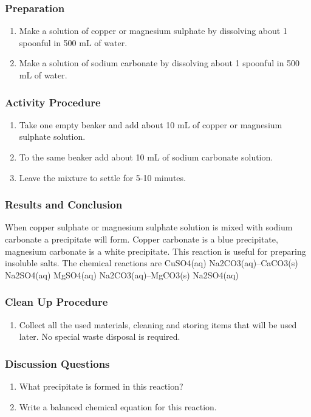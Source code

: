 \subsubsection*{Preparation}
\begin{enumerate}
\item{Make a solution of copper or magnesium sulphate by dissolving about 1 spoonful in 500 mL of water.}
\item{Make a solution of sodium carbonate by dissolving about 1 spoonful in 500 mL of water.}
\end{enumerate}

\subsubsection*{Activity Procedure}
\begin{enumerate}
\item{Take one empty beaker and add about 10 mL of copper or magnesium sulphate solution.}
\item{To the same beaker add about 10 mL of sodium carbonate solution.}
\item{Leave the mixture to settle for 5-10 minutes.}
\end{enumerate}

\subsubsection*{Results and Conclusion}
When copper sulphate or magnesium sulphate solution is mixed with sodium carbonate a precipitate will form. Copper carbonate is a blue precipitate, magnesium carbonate is a white precipitate. This reaction is useful for preparing insoluble salts.
The chemical reactions are 
CuSO4(aq) Na2CO3(aq)--CaCO3(s) Na2SO4(aq)
MgSO4(aq) Na2CO3(aq)--MgCO3(s) Na2SO4(aq)

\subsubsection*{Clean Up Procedure}
\begin{enumerate}
\item{Collect all the used materials, cleaning and storing items that will be used later. No special waste disposal is required.}
\end{enumerate}

\subsubsection*{Discussion Questions}
\begin{enumerate}
\item{What precipitate is formed in this reaction?}
\item{Write a balanced chemical equation for this reaction.}
\end{enumerate}


